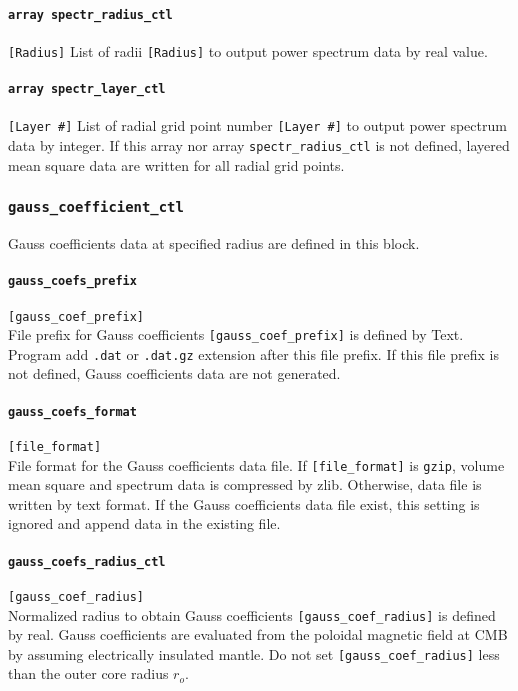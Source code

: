 \paragraph{\tt array spectr\_radius\_ctl}
\label{href_t:spectr_radius_ctl}
\verb|[Radius]|
List of radii \verb|[Radius]| to output power spectrum data by real value.
\paragraph{\tt array spectr\_layer\_ctl}
\label{href_t:spectr_layer_ctl}
\verb|[Layer #]|
List of radial grid point number \verb|[Layer #]| to output power spectrum data by integer. If this array nor array {\tt spectr\_radius\_ctl} is not defined, layered mean square data are written for all radial grid points.

%
\subsubsection{\tt gauss\_coefficient\_ctl}
\label{href_t:gauss_coefficient_ctl}
Gauss coefficients data at specified radius are defined in this block.

\paragraph{\tt gauss\_coefs\_prefix}
\label{href_t:gauss_coefs_prefix}
\verb|[gauss_coef_prefix]| \\
File prefix for Gauss coefficients \verb|[gauss_coef_prefix]| is defined by Text. Program add {\tt .dat} or {\tt .dat.gz} extension after this file prefix. If this file prefix is not defined, Gauss coefficients data are not generated. 

\paragraph{\tt gauss\_coefs\_format}
\label{href_t:gauss_coefs_format}
\verb|[file_format]| \\
File format for the Gauss coefficients data file. If \verb|[file_format]| is \verb|gzip|, volume mean square and spectrum data is compressed by zlib. Otherwise, data file is written by text format. If the Gauss coefficients data file exist, this setting is ignored and append data in the existing file.

\paragraph{\tt gauss\_coefs\_radius\_ctl}
\label{href_t:gauss_coefs_radius_ctl}
\verb|[gauss_coef_radius]| \\
Normalized radius to obtain Gauss coefficients \verb|[gauss_coef_radius]| is defined by real. Gauss coefficients are evaluated from the poloidal magnetic field at CMB by assuming electrically insulated mantle. Do not set \verb|[gauss_coef_radius]| less than the outer core radius $r_{o}$.

